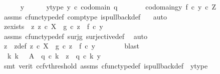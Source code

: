 \begin{isabellebody}
\ \ \ \ \isamarkupfalse%
\ y\isanewline
\ \ \ \ \isamarkupfalse%
\ y{\isacharunderscore}{\kern0pt}type{\isacharcolon}{\kern0pt}\ {\isachardoublequoteopen}y\ {\isasymin}\isactrlsub c\ codomain\ q{}{\isachardoublequoteclose}\isanewline
\ \ \ \ \isamarkupfalse%
\ \isamarkupfalse%
\ codomain{\isacharunderscore}{\kern0pt}gy{\isacharcolon}{\kern0pt}\ {\isachardoublequoteopen}f\ {\isasymcirc}\isactrlsub c\ y\ {\isasymin}\isactrlsub c\ Z{\isachardoublequoteclose}\isanewline
\ \ \ \ \ \ \isamarkupfalse%
\ assms{\isacharparenleft}{\kern0pt}{}{\isacharparenright}{\kern0pt}\ cfunc{\isacharunderscore}{\kern0pt}type{\isacharunderscore}{\kern0pt}def\ comp{\isacharunderscore}{\kern0pt}type\ is{\isacharunderscore}{\kern0pt}pullback{\isacharunderscore}{\kern0pt}def\ \ \isamarkupfalse%
\ auto\isanewline
\ \ \ \ \isamarkupfalse%
\ \isamarkupfalse%
\ z{\isacharunderscore}{\kern0pt}exists{\isacharcolon}{\kern0pt}\ {\isachardoublequoteopen}{\isasymexists}\ z{\isachardot}{\kern0pt}\ z\ {\isasymin}\isactrlsub c\ X\ {\isasymand}\ g\ {\isasymcirc}\isactrlsub c\ z\ {\isacharequal}{\kern0pt}\ f\ {\isasymcirc}\isactrlsub c\ y{\isachardoublequoteclose}\isanewline
\ \ \ \ \ \ \isamarkupfalse%
\ assms{\isacharparenleft}{\kern0pt}{}{\isacharparenright}{\kern0pt}\ cfunc{\isacharunderscore}{\kern0pt}type{\isacharunderscore}{\kern0pt}def\ surj{\isacharunderscore}{\kern0pt}g\ surjective{\isacharunderscore}{\kern0pt}def\ \isamarkupfalse%
\ auto\isanewline
\ \ \ \ \isamarkupfalse%
\ \isamarkupfalse%
\ z\ \ z{\isacharunderscore}{\kern0pt}def{\isacharcolon}{\kern0pt}\ {\isachardoublequoteopen}z\ {\isasymin}\isactrlsub c\ X\ {\isasymand}\ g\ {\isasymcirc}\isactrlsub c\ z\ {\isacharequal}{\kern0pt}\ f\ {\isasymcirc}\isactrlsub c\ y{\isachardoublequoteclose}\isanewline
\ \ \ \ \ \ \isamarkupfalse%
\ blast\isanewline
\ \ \ \ \isamarkupfalse%
\ \isamarkupfalse%
\ {\isachardoublequoteopen}{\isasymexists}{\isacharbang}{\kern0pt}\ k{\isachardot}{\kern0pt}\ k{\isacharcolon}{\kern0pt}\ {\isasymone}\ {\isasymrightarrow}\ A\ {\isasymand}\ q{}\ {\isasymcirc}\isactrlsub c\ k\ {\isacharequal}{\kern0pt}\ z\ {\isasymand}\ q{}\ {\isasymcirc}\isactrlsub c\ k\ {\isacharequal}{\kern0pt}y{\isachardoublequoteclose}\isanewline
\ \ \ \ \ \ \isamarkupfalse%
\ {\isacharparenleft}{\kern0pt}smt\ {\isacharparenleft}{\kern0pt}verit{\isacharcomma}{\kern0pt}\ ccfv{\isacharunderscore}{\kern0pt}threshold{\isacharparenright}{\kern0pt}\ assms{\isacharparenleft}{\kern0pt}{}{\isacharparenright}{\kern0pt}\ cfunc{\isacharunderscore}{\kern0pt}type{\isacharunderscore}{\kern0pt}def\ is{\isacharunderscore}{\kern0pt}pullback{\isacharunderscore}{\kern0pt}def\ \ y{\isacharunderscore}{\kern0pt}type{\isacharparenright}{\kern0pt}\ \ \ \ \ \ \isanewline

\end{isabellebody}
